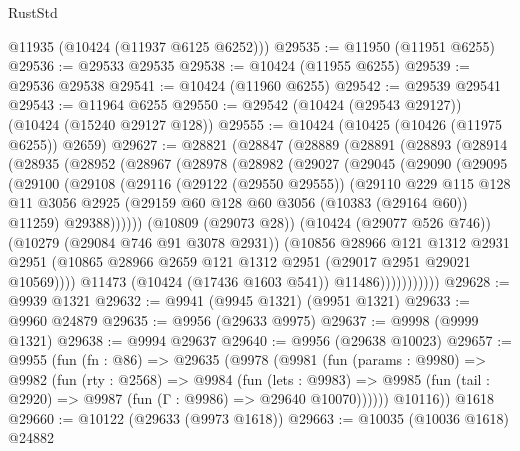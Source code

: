 \begin{lexlean}{RustStd}
\begin{coremodule}
      @11935
      (@10424 (@11937 @6125 @6252)))
@29535 := @11950 (@11951 @6255)
@29536 := @29533 @29535
@29538 := @10424 (@11955 @6255)
@29539 := @29536 @29538
@29541 := @10424 (@11960 @6255)
@29542 := @29539 @29541
@29543 := @11964 @6255
@29550 := @29542 (@10424 (@29543 @29127)) (@10424 (@15240 @29127 @128))
@29555 := @10424 (@10425 (@10426 (@11975 @6255)) @2659)
@29627 := @28821
    (@28847
      (@28889
        (@28891
          (@28893
            (@28914
              (@28935
                (@28952
                  (@28967
                    (@28978
                      (@28982
                        (@29027
                          (@29045
                            (@29090
                              (@29095
                                (@29100
                                  (@29108
                                    (@29116
                                      (@29122 (@29550 @29555))
                                      (@29110
                                        @229
                                        @115
                                        @128
                                        @11
                                        @3056
                                        @2925
                                        (@29159 @60 @128 @60 @3056 (@10383 (@29164 @60)) @11259)
                                        @29388))))))
                            (@10809 (@29073 @28))
                            (@10424 (@29077 @526 @746))
                            (@10279 (@29084 @746 @91 @3078 @2931))
                            (@10856
                              @28966
                              @121
                              @1312
                              @2931
                              @2951
                              (@10865 @28966 @2659 @121 @1312 @2951 (@29017 @2951 @29021 @10569))))
                          @11473
                          (@10424 (@17436 @1603 @541))
                          @11486)))))))))))
@29628 := @9939 @1321
@29632 := @9941 (@9945 @1321) (@9951 @1321)
@29633 := @9960 @24879
@29635 := @9956 (@29633 @9975)
@29637 := @9998 (@9999 @1321)
@29638 := @9994 @29637
@29640 := @9956 (@29638 @10023)
@29657 := @9955
    (fun (fn : @86) =>
    @29635
      (@9978
        (@9981
          (fun (params : @9980) =>
          @9982
            (fun (rty : @2568) =>
            @9984
              (fun (lets : @9983) =>
              @9985 (fun (tail : @2920) => @9987 (fun (Γ : @9986) => @29640 @10070))))))
        @10116))
    @1618
@29660 := @10122 (@29633 (@9973 @1618))
@29663 := @10035 (@10036 @1618) @24882

\end{coremodule}
\end{lexlean}
